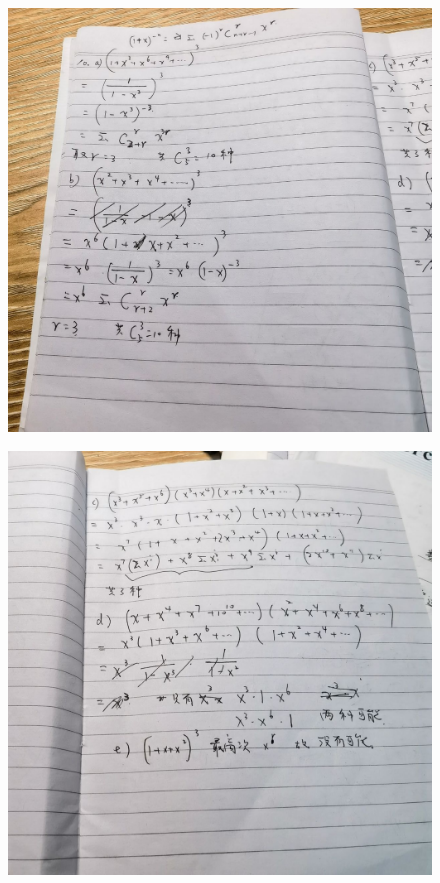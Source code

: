 \documentclass{article}
\begin{document}
   
    \begin{figure}[H]
    \centering
    \includegraphics[width=1\textwidth]{IMG_20221205_183636.jpg}
    \caption{\label{Lab9}}
    \end{figure}

    \begin{figure}[H]
    \centering
    \includegraphics[width=1\textwidth]{IMG_20221205_183638.jpg}
    \caption{\label{Lab9}}
    \end{figure}
\end{document}
